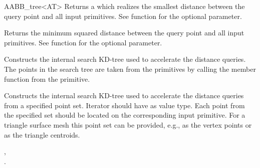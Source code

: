 \begin{ccRefClass}{AABB_tree<AT>}
{Returns a  which realizes the smallest distance between the query point and all input primitives. See  function for the optional  parameter. }

{Returns the minimum squared distance between the query point and all input primitives. See  function for the optional  parameter. }



{ Constructs the internal search KD-tree used to accelerate the distance queries. The points in the search tree are taken from the primitives by calling the member function  from the primitive.}

\begin{ccAdvanced}
{ Constructs the internal search KD-tree used to accelerate the distance queries from a specified point set. Iterator  should have  as value type. Each point from the specified  set should be located on the corresponding input primitive. For a triangle surface mesh this point set can be provided, e.g., as the vertex points or as the triangle centroids.}
\end{ccAdvanced}

\ccSeeAlso

, \\
.

\end{ccRefClass}

\ccRefPageEnd

